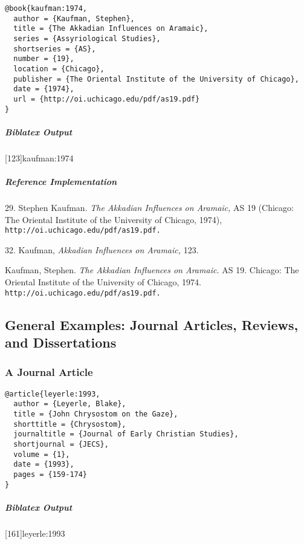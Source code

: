 \documentclass[a4paper]{article}
\newenvironment{biboutput}{%
  \subparagraph{Biblatex Output}
}{\color{black}}
\newenvironment{refimp}{%
  \subparagraph{Reference Implementation}
  \color{reference-colour}
  \rm
}{\par\color{black}}
\begin{document}
\begin{lstlisting}
@book{kaufman:1974,
  author = {Kaufman, Stephen},
  title = {The Akkadian Influences on Aramaic},
  series = {Assyriological Studies},
  shortseries = {AS},
  number = {19},
  location = {Chicago},
  publisher = {The Oriental Institute of the University of Chicago},
  date = {1974},
  url = {http://oi.uchicago.edu/pdf/as19.pdf}
}
\end{lstlisting}

\begin{biboutput}
  [123]{kaufman:1974}
\end{biboutput}

\begin{refimp}
  29. Stephen Kaufman. \emph{The Akkadian Influences on Aramaic,} AS 19
  (Chicago: The Oriental Institute of the University of Chicago, 1974),
  \nolinkurl{http://oi.uchicago.edu/pdf/as19.pdf.}

  32. Kaufman, \emph{Akkadian Influences on Aramaic,} 123.

  \hangindent\bibindent Kaufman, Stephen. \emph{The Akkadian Influences on
  Aramaic.} AS 19. Chicago: The Oriental Institute of the University of
  Chicago, 1974. \nolinkurl{http://oi.uchicago.edu/pdf/as19.pdf.}

\end{refimp}

\subsection{General Examples: Journal Articles, Reviews, and Dissertations}

\subsubsection{A Journal Article}

\begin{lstlisting}
@article{leyerle:1993,
  author = {Leyerle, Blake},
  title = {John Chrysostom on the Gaze},
  shorttitle = {Chrysostom},
  journaltitle = {Journal of Early Christian Studies},
  shortjournal = {JECS},
  volume = {1},
  date = {1993},
  pages = {159-174}
}
\end{lstlisting}  

\begin{biboutput}
  [161]{leyerle:1993}
\end{biboutput}
\end{document}

